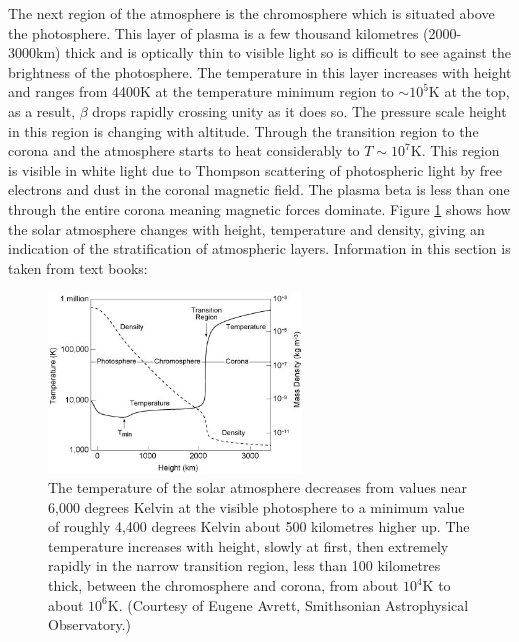 The next region of the atmosphere is the chromosphere which is situated above the photosphere. This layer of plasma is a few thousand kilometres (2000-3000km) thick and is optically thin to visible light so is difficult to see against the brightness of the photosphere. The temperature in this layer increases with height and ranges from 4400K at the temperature minimum region to $\sim10^{5}$K at the top, as a result, $\beta$ drops rapidly crossing unity as it does so. The pressure scale height in this region is changing with altitude. Through the transition region to the corona and the atmosphere starts to heat considerably to $T\sim10^{7}$K. This region is visible in white light due to Thompson scattering of photospheric light by free electrons and dust in the coronal magnetic field. The plasma beta is less than one through the entire corona meaning magnetic forces dominate. Figure \ref{solatm} shows how the solar atmosphere changes with height, temperature and density, giving an indication of the stratification of atmospheric layers. Information in this section is taken from text books: \cite{2003dysu.book.....D, 2004soas.book.....F}

\begin{figure}[H]
  \begin{center}
    \includegraphics[width=0.6\textwidth]{solar-atm-plot}
\caption{The temperature of the solar atmosphere decreases from values near 6,000 degrees Kelvin at the visible photosphere to a minimum value of roughly 4,400 degrees Kelvin about 500 kilometres higher up. The temperature increases with height, slowly at first, then extremely rapidly in the narrow transition region, less than 100 kilometres thick, between the chromosphere and corona, from about $10^{4}$K to about $10^{6}$K. (Courtesy of Eugene Avrett, Smithsonian Astrophysical Observatory.)}\label{solatm}
  \end{center}
\end{figure}


